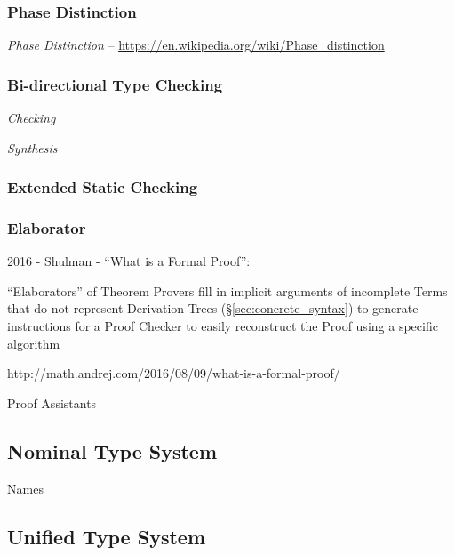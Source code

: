 \subsubsection{Phase Distinction}\label{sec:phase_distinction}

\emph{Phase Distinction} --
\url{https://en.wikipedia.org/wiki/Phase_distinction}



\subsubsection{Bi-directional Type Checking}
\label{sec:bidirectional_checking}

\emph{Checking}

\emph{Synthesis}



\subsubsection{Extended Static Checking}\label{sec:extended_static}

\subsubsection{Elaborator}\label{sec:elaborator}

2016 - Shulman - ``What is a Formal Proof'': %

``Elaborators'' of Theorem Provers fill in implicit arguments of
incomplete Terms that do not represent Derivation Trees
(\S\ref{sec:concrete_syntax}) to generate instructions for a Proof
Checker to easily reconstruct the Proof using a specific algorithm

http://math.andrej.com/2016/08/09/what-is-a-formal-proof/ %

Proof Assistants %



\subsection{Nominal Type System}\label{sec:nominal_type_system}

Names



\subsection{Unified Type System}\label{sec:unified_type_system}

